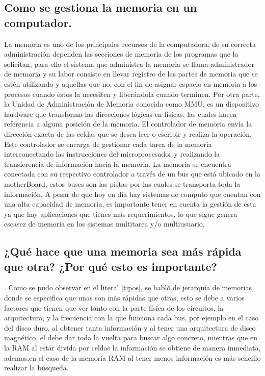 \documentclass{article}
\begin{document}
\subsection{Como se gestiona la memoria en un computador.} \label{contenido}
La memoria es uno de los principales recursos de la computadora, de su correcta administración dependen las secciones de memoria de los programas que la solicitan, para ello el sistema que administra la memoria se llama administrador de memoria y su labor consiste en llevar registro de las partes de memoria que se estén utilizando y aquellas que no, con el fin de asignar espacio en memoria a los procesos cuando éstos la necesiten y liberándola cuando terminen. 
Por otra parte, la Unidad de Administración de Memoria conocida como MMU, es un dispositivo hardware que transforma las direcciones lógicas en físicas, las cuales hacen referencia a alguna posición de la memoria. El controlador de memoria envía la dirección exacta de las celdas que se desea leer o escribir y realiza la operación\cite{aragon}. Este controlador se encarga de gestionar cada tarea de la memoria interconectando las instrucciones del microprocesador y realizando la transferencia de información hacia la memoria. La memoria se encuentra conectada con su respectivo controlador a través de un bus que está ubicado en la motherBoard, estos buses son las pistas por las cuales se transporta toda la información.
A pesar de que hoy en día hay sistemas de computo que cuentan con una alta capacidad de memoria, es importante tener en cuenta la gestión de esta ya que hay aplicaciones que tienes más requerimientos, lo que sigue genera escasez de memoria en los sistemas multitarea y/o multiusuario.\cite{augusto} \cite{manizales}

\subsection{¿Qué hace que una memoria sea más rápida que otra? ¿Por qué esto es importante?}.\label{comparacion}
Como se pudo observar en el literal \ref{tipos}, se habló de jerarquía de memorias, donde se especifica que unas son más rápidas que otras, esto se debe a varios factores que tienen que ver tanto con la parte física de los circuitos, la arquitectura, y la frecuencia con la que funciona cada bus, por ejemplo en el caso del disco duro, al obtener tanta información y al tener una arquitectura de disco magnético, el debe dar toda la vuelta para buscar algo concreto, mientras que en la RAM al estar divida por celdas la información se obtiene de manera inmediata, ademas,en el caso de la memoria RAM al tener menos información es más sencillo realizar la búsqueda.\\
\end{document}
